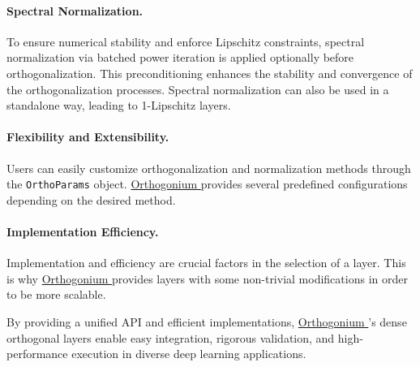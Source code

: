 \documentclass[10pt]{article}
\theoremstyle{plain}
\theoremstyle{definition}
\theoremstyle{remark}
\newcommand{\Orthogonium}{ \href{https://github.com/deel-ai/orthogonium/}{Orthogonium }}
\begin{document}
        
        
    
    \paragraph{Spectral Normalization.}
    To ensure numerical stability and enforce Lipschitz constraints, spectral normalization via batched power iteration is applied optionally before orthogonalization. This preconditioning enhances the stability and convergence of the orthogonalization processes. Spectral normalization can also be used in a standalone way, leading to 1-Lipschitz layers.
    
    \paragraph{Flexibility and Extensibility.}
    Users can easily customize orthogonalization and normalization methods through the \verb|OrthoParams| object. \Orthogonium provides several predefined configurations depending on the desired method.
    
    \paragraph{Implementation Efficiency.}
    Implementation and efficiency are crucial factors in the selection of a layer. This is why \Orthogonium provides layers with some non-trivial modifications in order to be more scalable. 
    
    By providing a unified API and efficient implementations, \Orthogonium’s dense orthogonal layers enable easy integration, rigorous validation, and high-performance execution in diverse deep learning applications.
\end{document}
